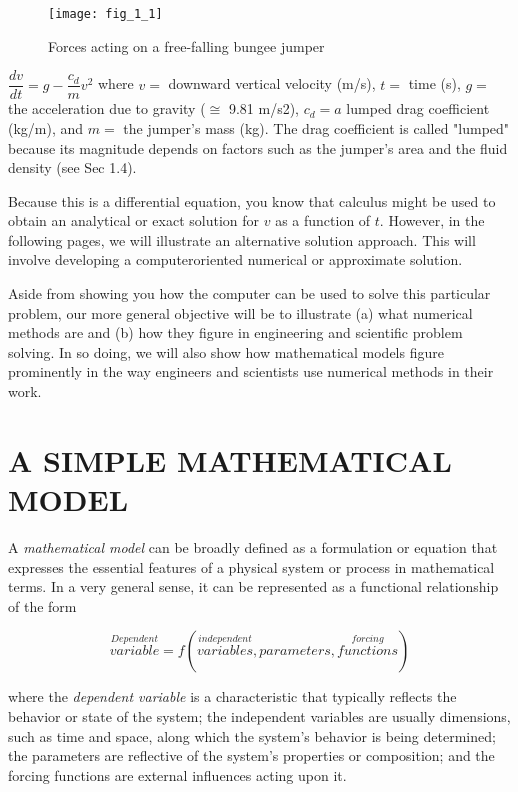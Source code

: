 \documentclass[../main.tex]{subfiles}
\begin{document}
    
\begin{wrapfigure}{l}{0.25\textwidth}
    \centering
    \texttt{[image: fig\_1\_1]}
   \caption{\textsf{Forces acting on a free-falling bungee jumper}}
   \label{fig:fig_1_1}
\end{wrapfigure}



$\dfrac{dv}{dt}=g-\dfrac{c_d}{m}v^2$
where $v =$ downward vertical velocity (m/s), $t =$ time (s), $g =$ the acceleration due to
gravity ($\cong$ 9.81 m/s2), $c_d = a$ lumped drag coefficient (kg/m), and $m =$ the jumper's
mass (kg). The drag coefficient is called "lumped" because its magnitude depends on factors such as the jumper's area and the fluid density (see Sec 1.4).


Because this is a differential equation, you know that calculus might be used to obtain
an analytical or exact solution for $v$ as a function of $t$. However, in the following pages, we
will illustrate an alternative solution approach. This will involve developing a computeroriented numerical or approximate solution.


Aside from showing you how the computer can be used to solve this particular problem, our more general objective will be to illustrate (a) what numerical methods are and
(b) how they figure in engineering and scientific problem solving. In so doing, we will also
show how mathematical models figure prominently in the way engineers and scientists use
numerical methods in their work.


\bigskip
\section{A SIMPLE MATHEMATICAL MODEL}
\label{sec:sec1}
  A \textsl{mathematical model} can be broadly defined as a formulation or equation that expresses
the essential features of a physical system or process in mathematical terms. In a very general sense, it can be represented as a functional relationship of the form


\begin{equation}
\tag{1.1}
\overset{Dependent}{variable} = f \left( \overset{independent}{variables},parameters,\overset{forcing}{functions}\right)  
\end{equation}
 
where the \textsl{dependent variable} is a characteristic that typically reflects the behavior or state
of the system; the independent variables are usually dimensions, such as time and space,
along which the system's behavior is being determined; the parameters are reflective of the
system's properties or composition; and the forcing functions are external influences acting
upon it.
\end{document}

